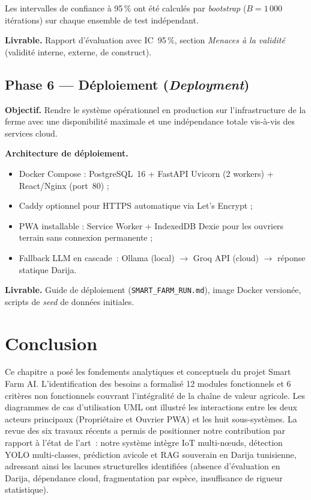 Les intervalles de confiance à 95\,\% ont été calculés par \textit{bootstrap}
($B = 1\,000$ itérations) sur chaque ensemble de test indépendant.

\textbf{Livrable.} Rapport d'évaluation avec IC~95\,\%, section
\textit{Menaces à la validité} (validité interne, externe, de construct).

\subsection*{Phase 6 --- Déploiement (\textit{Deployment})}

\textbf{Objectif.} Rendre le système opérationnel en production sur
l'infrastructure de la ferme avec une disponibilité maximale et une
indépendance totale vis-à-vis des services cloud.

\textbf{Architecture de déploiement.}
\begin{itemize}
  \item Docker Compose : PostgreSQL~16 + FastAPI Uvicorn (2 workers)
        + React/Nginx (port~80) ;
  \item Caddy optionnel pour HTTPS automatique via Let's Encrypt ;
  \item PWA installable : Service Worker + IndexedDB Dexie pour les
        ouvriers terrain sans connexion permanente ;
  \item Fallback LLM en cascade~:
        Ollama (local) $\rightarrow$ Groq API (cloud) $\rightarrow$
        réponse statique Darija.
\end{itemize}

\textbf{Livrable.} Guide de déploiement (\texttt{SMART\_FARM\_RUN.md}),
image Docker versionée, scripts de \textit{seed} de données initiales.

\section*{Conclusion}

Ce chapitre a posé les fondements analytiques et conceptuels du projet Smart Farm AI.
L'identification des besoins a formalisé 12 modules fonctionnels et 6 critères
non fonctionnels couvrant l'intégralité de la chaîne de valeur agricole.
Les diagrammes de cas d'utilisation UML ont illustré les interactions entre les
deux acteurs principaux (Propriétaire et Ouvrier PWA) et les huit sous-systèmes.
La revue des six travaux récents a permis de positionner notre contribution par
rapport à l'état de l'art~: notre système intègre IoT multi-nœuds, détection
YOLO multi-classes, prédiction avicole et RAG souverain en Darija tunisienne,
adressant ainsi les lacunes structurelles identifiées (absence d'évaluation en
Darija, dépendance cloud, fragmentation par espèce, insuffisance de rigueur
statistique).

